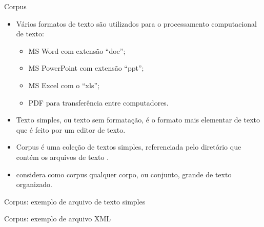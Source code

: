 \documentclass[%
  10pt,%
  aspectratio = 169,%
  compress,%
  t,%
]{beamer}%
\begin{document}
    \begin{frame}{}{Corpus}
        \begin{itemize}
            \item Vários formatos de texto são utilizados para o processamento computacional de texto:
            \begin{itemize}
                \item MS Word com extensão ``doc'';
                \item MS PowerPoint com extensão ``ppt'';
                \item MS Excel com o ``xls'';
                \item PDF para transferência entre computadores.
            \end{itemize}
            \item Texto simples, ou texto sem formatação, é o formato mais elementar de texto que é feito por um editor de texto.

            \item Corpus é uma coleção de textos simples, referenciada pelo diretório que contém os arquivos de texto \cite[p.~6]{Jo2018TMCIBDC}.

            \item \cite[p.~9]{KwartlerTMPWR2017} considera como corpus qualquer corpo, ou conjunto, grande de texto organizado.
        \end{itemize}
    \end{frame}

    \begin{frame}{}{Corpus: exemplo de arquivo de texto simples}
        
    \end{frame}

    \begin{frame}[fragile = singleslide]{}{Corpus: exemplo de arquivo XML}
        
    \end{frame}
\end{document}
